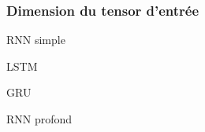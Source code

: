 
\begin{frame}
  \frametitle{Dimension du tensor d'entrée}
\end{frame}

\begin{frame}{RNN simple}
\end{frame}

\begin{frame}{LSTM}
\end{frame}

\begin{frame}{GRU}
\end{frame}

\begin{frame}{RNN profond}
\end{frame}
